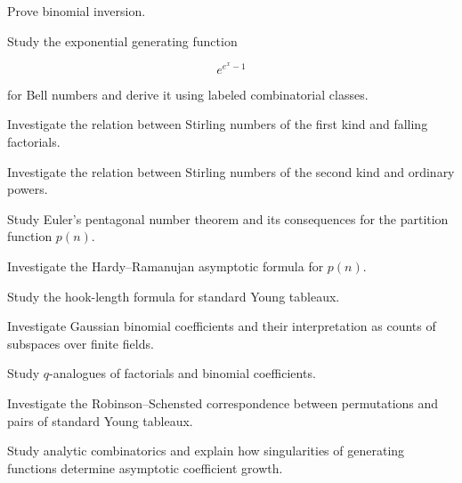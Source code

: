 \begin{exercise}[3]
Prove binomial inversion.
\end{exercise}

\begin{exercise}[4]
Study the exponential generating function

\[
e^{e^x-1}
\]

for Bell numbers and derive it using labeled combinatorial classes.
\end{exercise}

\begin{exercise}[4]
Investigate the relation between Stirling numbers of the first kind and
falling factorials.
\end{exercise}

\begin{exercise}[4]
Investigate the relation between Stirling numbers of the second kind
and ordinary powers.
\end{exercise}

\begin{exercise}[4]
Study Euler's pentagonal number theorem and its consequences for the
partition function \(p(n)\).
\end{exercise}

\begin{exercise}[4]
Investigate the Hardy--Ramanujan asymptotic formula for \(p(n)\).
\end{exercise}

\begin{exercise}[4]
Study the hook-length formula for standard Young tableaux.
\end{exercise}

\begin{exercise}[4]
Investigate Gaussian binomial coefficients and their interpretation as
counts of subspaces over finite fields.
\end{exercise}

\begin{exercise}[4]
Study \(q\)-analogues of factorials and binomial coefficients.
\end{exercise}

\begin{exercise}[4]
Investigate the Robinson--Schensted correspondence between permutations
and pairs of standard Young tableaux.
\end{exercise}

\begin{exercise}[4]
Study analytic combinatorics and explain how singularities of
generating functions determine asymptotic coefficient growth.
\end{exercise}

